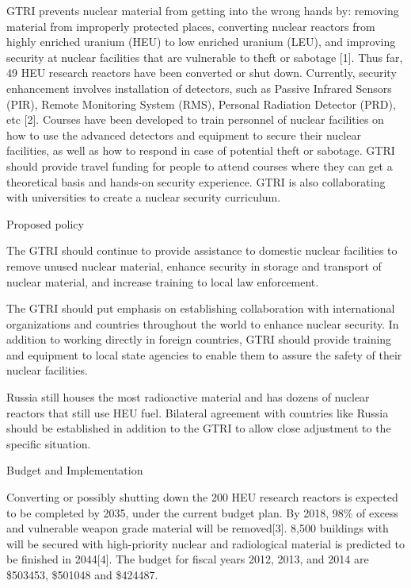 \documentclass{report}
\begin{document}
GTRI prevents nuclear material from getting into the wrong hands by: removing material from improperly protected places, converting nuclear  reactors from highly enriched uranium (HEU) to low enriched uranium (LEU), and improving security at nuclear facilities that are vulnerable to theft or sabotage [1]. Thus far, 49 HEU research reactors have been converted or shut down. Currently, security enhancement involves installation of detectors, such as Passive Infrared Sensors (PIR), Remote Monitoring System (RMS), Personal Radiation Detector (PRD), etc [2]. Courses have been developed to train personnel of nuclear facilities on how to use the advanced detectors and equipment to secure their nuclear facilities, as well as how to respond in case of potential theft or sabotage. GTRI should provide travel funding for people to attend courses where they can get a theoretical basis and hands-on security experience. GTRI is also collaborating with universities to create a nuclear security curriculum.

Proposed policy

The GTRI should continue to provide assistance to domestic nuclear facilities to remove unused nuclear material, enhance security in storage and transport of nuclear material, and increase training to local law enforcement. 

The GTRI should put emphasis on establishing collaboration with international organizations and countries throughout the world to enhance nuclear security.  In addition to working directly in foreign countries, GTRI should provide training and equipment to local state agencies to enable them to assure the safety of their nuclear facilities. 

Russia still houses the most radioactive material and has dozens of nuclear reactors that still use HEU fuel.  Bilateral agreement with countries like Russia should be established in addition to the GTRI to allow close adjustment to the specific situation. 

Budget and Implementation 

Converting or possibly shutting down the 200 HEU research reactors is expected to be completed by 2035, under the current budget plan.  By 2018, 98\% of excess and vulnerable weapon grade material will be removed[3]. 8,500 buildings with will be secured with high-priority nuclear and radiological material is predicted to be finished in 2044[4]. The budget for fiscal years 2012, 2013, and 2014 are \$503453, \$501048 and \$424487. 

\end{document}
